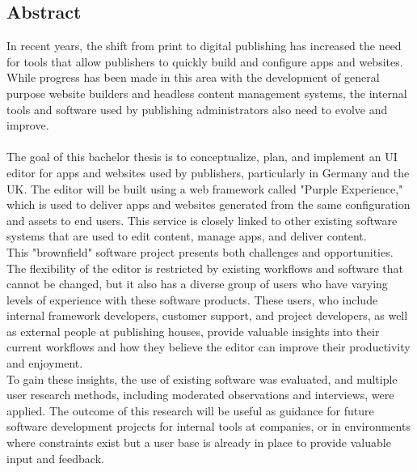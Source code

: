 %
\pagestyle{empty}

\subsection*{Abstract}

In recent years, the shift from print to digital publishing has increased the need for tools that allow publishers to quickly build and configure apps and websites.
While progress has been made in this area with the development of general purpose website builders and headless content management systems, the internal tools and software used by publishing administrators also need to evolve and improve.
\\\\
The goal of this bachelor thesis is to conceptualize, plan, and implement an UI editor for apps and websites used by publishers, particularly in Germany and the UK.
The editor will be built using a web framework called "Purple Experience," which is used to deliver apps and websites generated from the same configuration and assets to end users.
This service is closely linked to other existing software systems that are used to edit content, manage apps, and deliver content.
\\
This "brownfield" software project presents both challenges and opportunities.
The flexibility of the editor is restricted by existing workflows and software that cannot be changed, but it also has a diverse group of users who have varying levels of experience with these software products.
These users, who include internal framework developers, customer support, and project developers, as well as external people at publishing houses, provide valuable insights into their current workflows and how they believe the editor can improve their productivity and enjoyment.
\\
To gain these insights, the use of existing software was evaluated, and multiple user research methods, including moderated observations and interviews, were applied.
The outcome of this research will be useful as guidance for future software development projects for internal tools at companies,
or in environments where constraints exist but a user base is already in place to provide valuable input and feedback.
